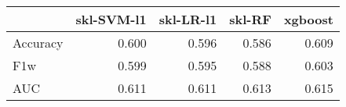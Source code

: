 \begin{tabular}{lrrrr}
\toprule
{} &  skl-SVM-l1 &  skl-LR-l1 &  skl-RF &  xgboost \\
\midrule
Accuracy &       0.600 &      0.596 &   0.586 &    0.609 \\
F1w      &       0.599 &      0.595 &   0.588 &    0.603 \\
AUC      &       0.611 &      0.611 &   0.613 &    0.615 \\
\bottomrule
\end{tabular}
